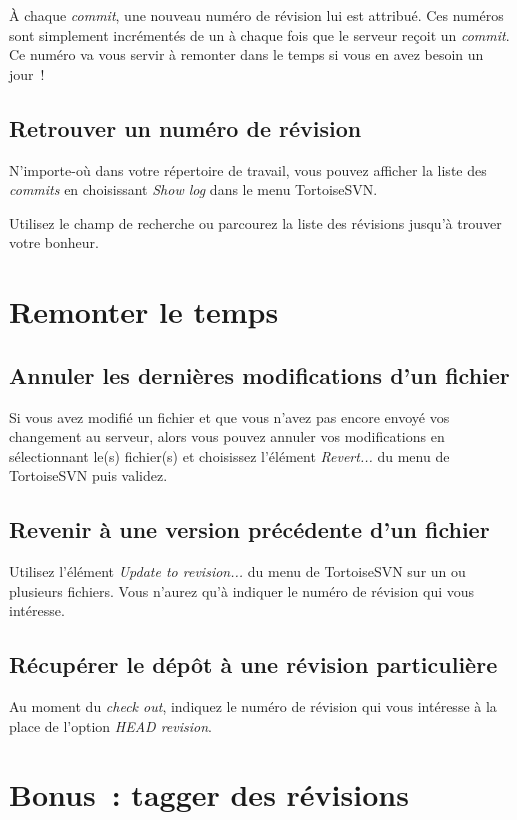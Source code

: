 À chaque \emph{commit}, une nouveau numéro de révision lui est attribué. Ces numéros sont simplement incrémentés de un à chaque fois que le serveur reçoit un \emph{commit}. Ce numéro va vous servir à remonter dans le temps si vous en avez besoin un jour~!

\subsection{Retrouver un numéro de révision}

N'importe-où dans votre répertoire de travail, vous pouvez afficher la liste des \emph{commits} en choisissant \emph{Show log} dans le menu TortoiseSVN.

Utilisez le champ de recherche ou parcourez la liste des révisions jusqu'à trouver votre bonheur.


\section{Remonter le temps}

\subsection{Annuler les dernières modifications d'un fichier}

Si vous avez modifié un fichier et que vous n’avez pas encore envoyé vos changement au serveur, alors vous pouvez annuler vos modifications en sélectionnant le(s) fichier(s) et choisissez l'élément \emph{Revert...} du menu de TortoiseSVN puis validez.

\subsection{Revenir à une version précédente d'un fichier}

Utilisez l'élément \emph{Update to revision...} du menu de TortoiseSVN sur un ou plusieurs fichiers. Vous n'aurez qu'à indiquer le numéro de révision qui vous intéresse.

\subsection{Récupérer le dépôt à une révision particulière}

Au moment du \emph{check out}, indiquez le numéro de révision qui vous intéresse à la place de l'option \emph{HEAD revision}.

\section{Bonus~: tagger des révisions}

